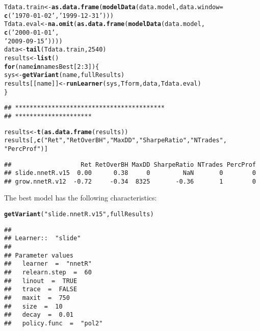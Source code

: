 \documentclass{article}\usepackage[]{graphicx}\usepackage[]{color}
\makeatletter
\newcommand{\hlnum}[1]{\textcolor[rgb]{0.686,0.059,0.569}{#1}}%
\newcommand{\hlstr}[1]{\textcolor[rgb]{0.192,0.494,0.8}{#1}}%
\newcommand{\hlopt}[1]{\textcolor[rgb]{0,0,0}{#1}}%
\newcommand{\hlstd}[1]{\textcolor[rgb]{0.345,0.345,0.345}{#1}}%
\newcommand{\hlkwa}[1]{\textcolor[rgb]{0.161,0.373,0.58}{\textbf{#1}}}%
\newcommand{\hlkwb}[1]{\textcolor[rgb]{0.69,0.353,0.396}{#1}}%
\newcommand{\hlkwc}[1]{\textcolor[rgb]{0.333,0.667,0.333}{#1}}%
\newcommand{\hlkwd}[1]{\textcolor[rgb]{0.737,0.353,0.396}{\textbf{#1}}}%
\newenvironment{kframe}{%
 \def\at@end@of@kframe{}%
 \ifinner\ifhmode%
  \def\at@end@of@kframe{\end{minipage}}%
  \begin{minipage}{\columnwidth}%
 \fi\fi%
 \def\FrameCommand##1{\hskip\@totalleftmargin \hskip-\fboxsep
 \colorbox{shadecolor}{##1}\hskip-\fboxsep
     \hskip-\linewidth \hskip-\@totalleftmargin \hskip\columnwidth}%
 \MakeFramed {\advance\hsize-\width
   \@totalleftmargin\z@ \linewidth\hsize
   \@setminipage}}%
 {\par\unskip\endMakeFramed%
 \at@end@of@kframe}
\newenvironment{knitrout}{}{} %
\makeatother
\begin{document}
\begin{knitrout}
\color{fgcolor}\begin{kframe}
\begin{alltt}
\hlstd{Tdata.train} \hlkwb{<-} \hlkwd{as.data.frame}\hlstd{(}\hlkwd{modelData}\hlstd{(data.model,} \hlkwc{data.window} \hlstd{=}
                                         \hlkwd{c}\hlstd{(}\hlstr{'1970-01-02'}\hlstd{,}\hlstr{'1999-12-31'}\hlstd{)))}
\hlstd{Tdata.eval} \hlkwb{<-} \hlkwd{na.omit}\hlstd{(}\hlkwd{as.data.frame}\hlstd{(}\hlkwd{modelData}\hlstd{(data.model,}
                                               \hlkwd{c}\hlstd{(}\hlstr{'2000-01-01'}\hlstd{,}
                                                 \hlstr{'2009-09-15'}\hlstd{))))}
\hlstd{data} \hlkwb{<-} \hlkwd{tail}\hlstd{(Tdata.train,} \hlnum{2540}\hlstd{)}
\hlstd{results} \hlkwb{<-} \hlkwd{list}\hlstd{()}
\hlkwa{for}\hlstd{(name} \hlkwa{in} \hlstd{namesBest[}\hlnum{2}\hlopt{:}\hlnum{3}\hlstd{]) \{}
  \hlstd{sys} \hlkwb{<-} \hlkwd{getVariant}\hlstd{(name, fullResults)}
  \hlstd{results[[name]]} \hlkwb{<-} \hlkwd{runLearner}\hlstd{(sys, Tform, data, Tdata.eval)}
\hlstd{\}}
\end{alltt}
\begin{verbatim}
## *****************************************
## *********************
\end{verbatim}


{\ttfamily\noindent\color{warningcolor}{\#\# Warning: no non-missing arguments to max; returning -Inf\\\#\# Warning: no non-missing arguments to min; returning Inf}}\begin{alltt}
\hlstd{results} \hlkwb{<-} \hlkwd{t}\hlstd{(}\hlkwd{as.data.frame}\hlstd{(results))}
\hlstd{results[,} \hlkwd{c}\hlstd{(}\hlstr{"Ret"}\hlstd{,} \hlstr{"RetOverBH"}\hlstd{,} \hlstr{"MaxDD"}\hlstd{,} \hlstr{"SharpeRatio"}\hlstd{,} \hlstr{"NTrades"}\hlstd{,}
            \hlstr{"PercProf"}\hlstd{)]}
\end{alltt}
\begin{verbatim}
##                   Ret RetOverBH MaxDD SharpeRatio NTrades PercProf
## slide.nnetR.v15  0.00      0.38     0         NaN       0        0
## grow.nnetR.v12  -0.72     -0.34  8325       -0.36       1        0
\end{verbatim}
\end{kframe}
\end{knitrout}
The best model has the following characteristics:
\begin{knitrout}
\color{fgcolor}\begin{kframe}
\begin{alltt}
\hlkwd{getVariant}\hlstd{(}\hlstr{"slide.nnetR.v15"}\hlstd{, fullResults)}
\end{alltt}
\begin{verbatim}
## 
## Learner::  "slide" 
## 
## Parameter values
## 	 learner  =  "nnetR" 
## 	 relearn.step  =  60 
## 	 linout  =  TRUE 
## 	 trace  =  FALSE 
## 	 maxit  =  750 
## 	 size  =  10 
## 	 decay  =  0.01 
## 	 policy.func  =  "pol2"
\end{verbatim}
\end{kframe}
\end{knitrout}
\end{document}
